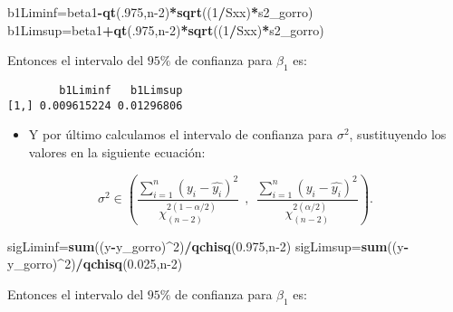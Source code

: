 \documentclass[
  a4paper,
  oneside,
  openany]{book}
\newenvironment{Shaded}{\begin{snugshade}}{\end{snugshade}}
\newcommand{\DecValTok}[1]{\textcolor[rgb]{0.00,0.00,0.81}{#1}}
\newcommand{\FloatTok}[1]{\textcolor[rgb]{0.00,0.00,0.81}{#1}}
\newcommand{\FunctionTok}[1]{\textcolor[rgb]{0.13,0.29,0.53}{\textbf{#1}}}
\newcommand{\NormalTok}[1]{#1}
\newcommand{\OtherTok}[1]{\textcolor[rgb]{0.56,0.35,0.01}{#1}}
\newcommand{\SpecialCharTok}[1]{\textcolor[rgb]{0.81,0.36,0.00}{\textbf{#1}}}
\providecommand{\tightlist}{%
  \setlength{\itemsep}{0pt}\setlength{\parskip}{0pt}}
\begin{document}
\begin{Shaded}
\begin{Highlighting}[]
\NormalTok{b1Liminf}\OtherTok{=}\NormalTok{beta1}\SpecialCharTok{{-}}\FunctionTok{qt}\NormalTok{(.}\DecValTok{975}\NormalTok{,n}\DecValTok{{-}2}\NormalTok{)}\SpecialCharTok{*}\FunctionTok{sqrt}\NormalTok{((}\DecValTok{1}\SpecialCharTok{/}\NormalTok{Sxx)}\SpecialCharTok{*}\NormalTok{s2\_gorro) }
\NormalTok{b1Limsup}\OtherTok{=}\NormalTok{beta1}\SpecialCharTok{+}\FunctionTok{qt}\NormalTok{(.}\DecValTok{975}\NormalTok{,n}\DecValTok{{-}2}\NormalTok{)}\SpecialCharTok{*}\FunctionTok{sqrt}\NormalTok{((}\DecValTok{1}\SpecialCharTok{/}\NormalTok{Sxx)}\SpecialCharTok{*}\NormalTok{s2\_gorro) }
\end{Highlighting}
\end{Shaded}

Entonces el intervalo del \(95\%\) de confianza para \(\beta_{1}\) es:

\begin{verbatim}
        b1Liminf   b1Limsup
[1,] 0.009615224 0.01296806
\end{verbatim}

\begin{itemize}
\tightlist
\item
  Y por último calculamos el intervalo de confianza para \(\sigma^2\), sustituyendo los valores en la siguiente ecuación:
\end{itemize}

\[\sigma^2 \in \left( \frac{\sum_{i=1}^{n}(y_i-\hat{y_{i}})^2}{\chi^{2(1-\alpha/2)}_{(n-2)}} \ \ , \ \ \frac{\sum_{i=1}^{n}(y_i-\hat{y_{i}})^2} {\chi^{2(\alpha/2)}_{(n-2)}} \right).\]

\begin{Shaded}
\begin{Highlighting}[]
\NormalTok{sigLiminf}\OtherTok{=}\FunctionTok{sum}\NormalTok{((y}\SpecialCharTok{{-}}\NormalTok{y\_gorro)}\SpecialCharTok{\^{}}\DecValTok{2}\NormalTok{)}\SpecialCharTok{/}\FunctionTok{qchisq}\NormalTok{(}\FloatTok{0.975}\NormalTok{,n}\DecValTok{{-}2}\NormalTok{) }
\NormalTok{sigLimsup}\OtherTok{=}\FunctionTok{sum}\NormalTok{((y}\SpecialCharTok{{-}}\NormalTok{y\_gorro)}\SpecialCharTok{\^{}}\DecValTok{2}\NormalTok{)}\SpecialCharTok{/}\FunctionTok{qchisq}\NormalTok{(}\FloatTok{0.025}\NormalTok{,n}\DecValTok{{-}2}\NormalTok{) }
\end{Highlighting}
\end{Shaded}

Entonces el intervalo del \(95\%\) de confianza para \(\beta_{1}\) es:
\end{document}

